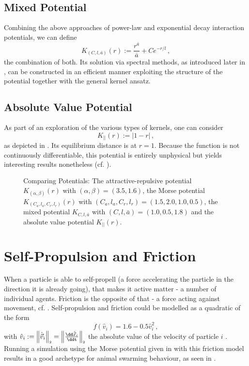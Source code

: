 \subsection{Mixed Potential}
Combining the above approaches of power-law and exponential decay interaction potentials, we can define
$$K_{(C, l, \bar{a})}(r) := \frac{r^{\bar{a}}}{\bar{a}} + C e^{-r/l}\,,$$
the combination of both.
Its solution via spectral methods, as introduced later in , can be constructed in an efficient manner exploiting the structure of the potential together with the general kernel ansatz.

\subsection{Absolute Value Potential}
As part of an exploration of the various types of kernels, one can consider
\begin{equation}
  K_{||}(r) := |1-r|\,,
  \label{eq:absvalue-potential}
\end{equation}
as depicted in .
Its equilibrium distance is at $r = 1$.
Because the function is not continuously differentiable, this potential is entirely unphysical but yields interesting results nonetheless (cf. ).

\begin{figure}[H]
  \centering
  \caption[Comparing potentials]{Comparing Potentials: The attractive-repulsive potential $K_{(\alpha,\beta)}(r)$ with $(\alpha,\beta) = (3.5, 1.6)$, the Morse potential $K_{(C_a, l_a, C_r, l_r)}(r)$ with $(C_a, l_a, C_r, l_r) = (1.5, 2.0, 1.0, 0.5)$, the mixed potential $K_{C, l, \bar{a}}$ with $(C, l, \bar{a}) = (1.0, 0.5, 1.8)$ and the absolute value potential $K_{||}(r)$.}
  \label{fig:comparing-potentials}
\end{figure}

\section{Self-Propulsion and Friction}
\label{sec:self-propulsion-friction}
When a particle is able to self-propell (a force accelerating the particle in the direction it is already going), that makes it active matter - a number of individual agents.
Friction is the opposite of that - a force acting against movement, cf. .
Self-propulsion and friction could be modelled as a quadratic of the form
$$f(\hat{v}_i) = 1.6 - 0.5 \hat{v}_i^2\,,$$
with $\hat{v}_i := \norm{\hatvec{v}_i} = \norm{\frac{\dd\hatvec{x}_i}{\ddt}}$ the absolute value of the velocity of particle $i$ \parencite{2006-self-propelled}.
Running a simulation using the Morse potential given in  with this friction model results in a good archetype for animal swarming behaviour, as seen in .

